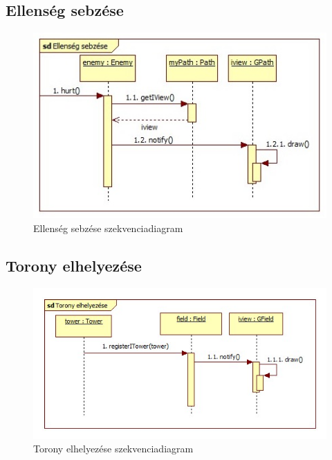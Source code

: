 \subsection{Ellenség sebzése}
\begin{figure}[H]
\begin{center}
\includegraphics[width=17cm]{chapters/chapter11/images/Ellenseg_sebzese.jpg}
\caption{Ellenség sebzése szekvenciadiagram}
\label{fig:Ellenseg_sebzese}
\end{center}
\end{figure}

\subsection{Torony elhelyezése}
\begin{figure}[H]
\begin{center}
\includegraphics[width=17cm]{chapters/chapter11/images/Torony_elhelyezese.jpg}
\caption{Torony elhelyezése szekvenciadiagram}
\label{fig:Torony_elhelyezese}
\end{center}
\end{figure}

